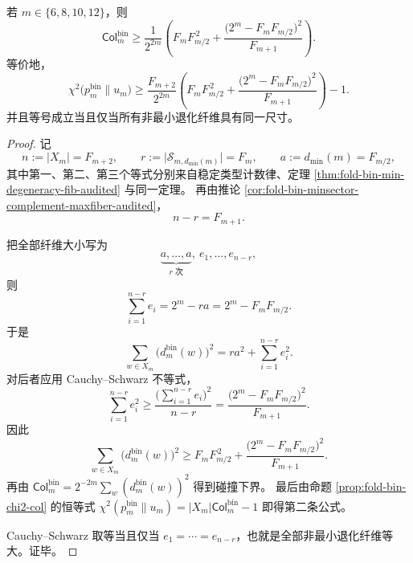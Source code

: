 \begin{theorem}[审计偶数窗上最小退化扇区强制的显式碰撞下界]\label{thm:xi-foldbin-audited-even-minsector-collision-explicit-floor}
若
\(
m\in\{6,8,10,12\}
\)，则
\[
\boxed{\;
\mathsf{Col}^{\mathrm{bin}}_m
\ge
\frac{1}{2^{2m}}
\left(
F_mF_{m/2}^{\,2}
+
\frac{\bigl(2^m-F_mF_{m/2}\bigr)^2}{F_{m+1}}
\right).\;}
\]
等价地，
\[
\boxed{\;
\chi^2\!\bigl(p_m^{\mathrm{bin}}\|u_m\bigr)
\ge
\frac{F_{m+2}}{2^{2m}}
\left(
F_mF_{m/2}^{\,2}
+
\frac{\bigl(2^m-F_mF_{m/2}\bigr)^2}{F_{m+1}}
\right)-1.\;}
\]
并且等号成立当且仅当所有非最小退化纤维具有同一尺寸。
\end{theorem}
\begin{proof}
记
\[
n:=|X_m|=F_{m+2},
\qquad
r:=\bigl|\mathcal S_{m,d_{\min}(m)}\bigr|=F_m,
\qquad
a:=d_{\min}(m)=F_{m/2},
\]
其中第一、第二、第三个等式分别来自稳定类型计数律、定理 \ref{thm:fold-bin-min-degeneracy-fib-audited} 与同一定理。
再由推论 \ref{cor:fold-bin-minsector-complement-maxfiber-audited}，
\[
n-r=F_{m+1}.
\]

把全部纤维大小写为
\[
\underbrace{a,\dots,a}_{r\text{ 次}},\ e_1,\dots,e_{n-r},
\]
则
\[
\sum_{i=1}^{n-r}e_i=2^m-ra=2^m-F_mF_{m/2}.
\]
于是
\[
\sum_{w\in X_m}\bigl(d_m^{\mathrm{bin}}(w)\bigr)^2
=
ra^2+\sum_{i=1}^{n-r}e_i^2.
\]
对后者应用 Cauchy--Schwarz 不等式，
\[
\sum_{i=1}^{n-r}e_i^2
\ge
\frac{\bigl(\sum_{i=1}^{n-r}e_i\bigr)^2}{n-r}
=
\frac{\bigl(2^m-F_mF_{m/2}\bigr)^2}{F_{m+1}}.
\]
因此
\[
\sum_{w\in X_m}\bigl(d_m^{\mathrm{bin}}(w)\bigr)^2
\ge
F_mF_{m/2}^{\,2}
+
\frac{\bigl(2^m-F_mF_{m/2}\bigr)^2}{F_{m+1}}.
\]
再由
\(
\mathsf{Col}^{\mathrm{bin}}_m
=
2^{-2m}\sum_w(d_m^{\mathrm{bin}}(w))^2
\)
得到碰撞下界。
最后由命题 \ref{prop:fold-bin-chi2-col} 的恒等式
\(
\chi^2(p_m^{\mathrm{bin}}\|u_m)=|X_m|\mathsf{Col}^{\mathrm{bin}}_m-1
\)
即得第二条公式。

Cauchy--Schwarz 取等当且仅当
\(
e_1=\cdots=e_{n-r}
\)，也就是全部非最小退化纤维等大。证毕。
\end{proof}

